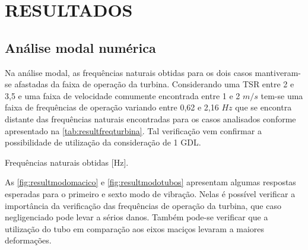 
\chapter{RESULTADOS}
\label{chap:resultados}


\section{Análise modal numérica}
\label{sec:resultmodal}

Na análise modal, as frequências naturais obtidas para os dois casos mantiveram-se afastadas da faixa de operação da turbina. Considerando uma TSR entre 2 e 3,5 e uma faixa de velocidade comumente encontrada entre 1 e 2 $m/s$ tem-se uma faixa de frequências de operação variando entre 0,62 e 2,16 $Hz$ que se encontra distante das frequências naturais encontradas para os casos analisados conforme apresentado na \autoref{tab:resultfreqturbina}. Tal verificação vem confirmar a possibilidade de utilização da consideração de 1 GDL. 

\begin{table}[h]
	\centering
	\caption{Frequências naturais obtidas [Hz].}
	\label{tab:resultfreqturbina}	
	
\end{table}

As \autoref{fig:resultmodomacico} e \autoref{fig:resultmodotubos} apresentam algumas respostas esperadas para o primeiro e sexto modo de vibração. Nelas é possível verificar a importância da verificação das frequências de operação da turbina, que caso negligenciado pode levar a sérios danos. Também pode-se verificar que a utilização do tubo em comparação aos eixos maciços levaram a maiores deformações.    

